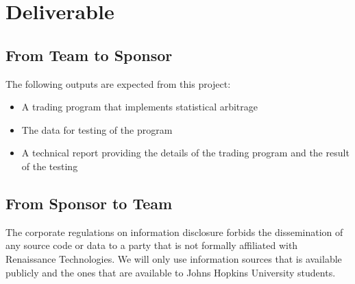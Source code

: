 \documentclass[12pt,letterpaper]{article}
\theoremstyle{definition}
\begin{document}
\section{Deliverable}
\subsection{From Team to Sponsor} %
The following outputs are expected from this project:
\begin{itemize}
\item A trading program that implements statistical arbitrage
\item The data for testing of the program
\item A technical report providing the details of the trading program
  and the result of the testing
\end{itemize}

\subsection{From Sponsor to Team} %

The corporate regulations on information disclosure forbids the
dissemination of any source code or data to a party that is not
formally affiliated with Renaissance Technologies. We will only use
information sources that is available publicly and the ones that are
available to Johns Hopkins University students.


%
%
\end{document}
